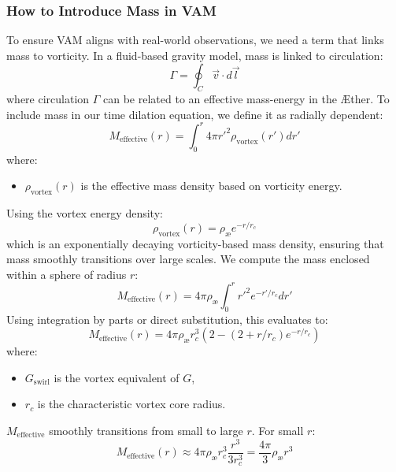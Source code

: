 \subsubsection*{How to Introduce Mass in VAM}
To ensure VAM aligns with real-world observations, we need a term that links mass to vorticity. In a fluid-based gravity model, mass is linked to circulation:
\begin{equation}
    \Gamma = \oint_C \vec{v} \cdot d\vec{l}
\end{equation}
where circulation $\Gamma$ can be related to an effective mass-energy in the \AE ther. To include mass in our time dilation equation, we define it as radially dependent:
\begin{equation}
    M_{\text{effective}}(r) = \int_0^r 4\pi r'^2 \rho_{\text{vortex}}(r') dr'
\end{equation}
where:
\begin{itemize}
    \item $\rho_{\text{vortex}}(r)$ is the effective mass density based on vorticity energy.
\end{itemize}
Using the vortex energy density:
\begin{equation}
    \rho_{\text{vortex}}(r) = \rho_{\text{\ae}} e^{-r / r_c}
\end{equation}
which is an exponentially decaying vorticity-based mass density, ensuring that mass smoothly transitions over large scales. We compute the mass enclosed within a sphere of radius $r$:
\begin{equation}
    M_{\text{effective}}(r) = 4\pi \rho_{\text{\ae}} \int_0^r r'^2 e^{-r' / r_c} dr'
\end{equation}
Using integration by parts or direct substitution, this evaluates to:
\begin{equation}
    M_{\text{effective}}(r) = 4\pi \rho_{\text{\ae}} r_c^3 \left( 2 - (2 + r/r_c) e^{-r / r_c} \right)
\end{equation}
where:
\begin{itemize}
    \item $G_{\text{swirl}}$ is the vortex equivalent of $G$,
    \item $r_c$ is the characteristic vortex core radius.
\end{itemize}
$M_{\text{effective}}$ smoothly transitions from small to large $r$. For small $r$:
\begin{equation}
    M_{\text{effective}}(r) \approx 4\pi \rho_{\text{\ae}} r_c^3 \frac{r^3}{3 r_c^3} = \frac{4\pi}{3} \rho_{\text{\ae}} r^3
\end{equation}

